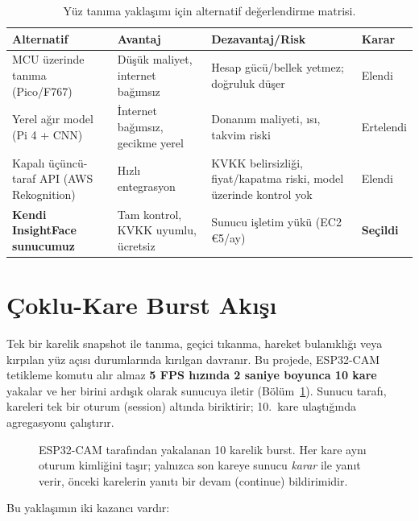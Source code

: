 \begin{table}[h!]
\centering
\caption{Yüz tanıma yaklaşımı için alternatif değerlendirme matrisi.}
\label{tab:alternatif-degerlendirme}
\small
\begin{tabularx}{\linewidth}{l X X l}
\toprule
\textbf{Alternatif} & \textbf{Avantaj} & \textbf{Dezavantaj/Risk} & \textbf{Karar}\\
\midrule
MCU üzerinde tanıma (Pico/F767) & Düşük maliyet, internet bağımsız &
Hesap gücü/bellek yetmez; doğruluk düşer & Elendi \\
Yerel ağır model (Pi 4 + CNN) & İnternet bağımsız, gecikme yerel &
Donanım maliyeti, ısı, takvim riski & Ertelendi \\
Kapalı üçüncü-taraf API (AWS Rekognition) & Hızlı entegrasyon &
KVKK belirsizliği, fiyat/kapatma riski, model üzerinde kontrol yok & Elendi \\
\textbf{Kendi InsightFace sunucumuz} & Tam kontrol, KVKK uyumlu, ücretsiz &
Sunucu işletim yükü (EC2 €5/ay) & \textbf{Seçildi} \\
\bottomrule
\end{tabularx}
\end{table}

\section{Çoklu-Kare Burst Akışı}

Tek bir karelik snapshot ile tanıma, geçici tıkanma, hareket bulanıklığı
veya kırpılan yüz açısı durumlarında kırılgan davranır. Bu projede,
ESP32-CAM tetikleme komutu alır almaz \textbf{5 FPS hızında 2 saniye
boyunca 10 kare} yakalar ve her birini ardışık olarak sunucuya iletir
(Bölüm~\ref{fig:burst-akisi}). Sunucu tarafı, kareleri tek bir oturum (session)
altında biriktirir; 10.\ kare ulaştığında agregasyonu çalıştırır.

\begin{figure}[h!]
\centering
{}
\caption{ESP32-CAM tarafından yakalanan 10 karelik burst. Her kare aynı oturum kimliğini taşır;
yalnızca son kareye sunucu \emph{karar} ile yanıt verir, önceki karelerin yanıtı bir devam (continue) bildirimidir.}
\label{fig:burst-akisi}
\end{figure}

Bu yaklaşımın iki kazancı vardır:

